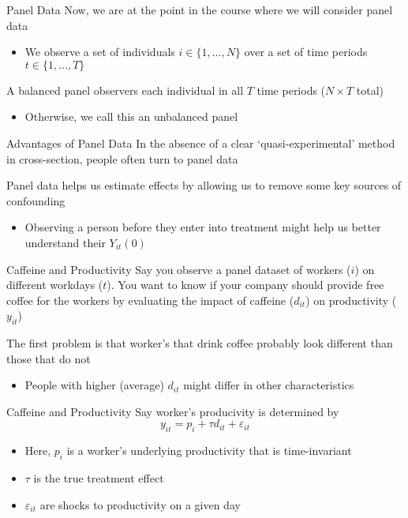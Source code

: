 \documentclass[aspectratio=169,t,11pt,table]{beamer}
\begin{document}
\begin{frame}{Panel Data}
  Now, we are at the point in the course where we will consider panel data
  \begin{itemize}
    \item We observe a set of individuals $i \in \{ 1, \dots, N \}$ over a set of time periods $t \in \{ 1, \dots, T \}$
  \end{itemize}
  
  \bigskip

  \bigskip
  A \alert{balanced panel} observers each individual in all $T$ time periods ($N \times T$ total)
  \begin{itemize}
    \item Otherwise, we call this an \alert{unbalanced panel}
  \end{itemize}

\end{frame}

\begin{frame}{Advantages of Panel Data}
  In the absence of a clear `quasi-experimental' method in cross-section, people often turn to panel data

  \bigskip
  Panel data helps us estimate effects by allowing us to remove some key sources of confounding
  \begin{itemize}
    \item Observing a person before they enter into treatment might help us better understand their $Y_{it}(0)$ 
  \end{itemize}
\end{frame}

\begin{frame}{Caffeine and Productivity}
  Say you observe a panel dataset of workers ($i$) on different workdays ($t$).
  You want to know if your company should provide free coffee for the workers by evaluating the impact of caffeine ($d_{it}$) on productivity ($y_{it}$)
  
  
  \Hugeskip
  The first problem is that worker's that drink coffee probably look different than those that do not
  \begin{itemize}
    \item People with higher (average) $d_{it}$ might differ in other characteristics
  \end{itemize}
\end{frame}

\begin{frame}{Caffeine and Productivity}
  Say worker's producivity is determined by 
  $$
    y_{it} = p_i + \tau d_{it} + \varepsilon_{it}
  $$
  \begin{itemize}
    \item Here, $p_i$ is a worker's underlying productivity that is time-invariant
    \item $\tau$ is the true treatment effect
    \item $\varepsilon_{it}$ are shocks to productivity on a given day
  \end{itemize}
\end{frame}
\end{document}
